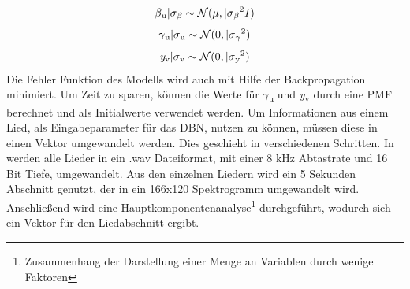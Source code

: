 \documentclass[twosided,a4,10pt]{article}
\begin{document}
\begin{multicols}{2}
\begin{equation*}
		\end{equation*}
		\begin{equation*}
		\centering
		\beta\textsubscript{u}|\sigma\textsubscript{$\beta$}\sim\mathcal{N}(\mu,|\sigma\textsubscript{$\beta$}\textsuperscript{2}I)
		\end{equation*}
		\begin{equation*}
		\centering
		\gamma\textsubscript{u}|\sigma\textsubscript{u}\sim\mathcal{N}(0,|\sigma\textsubscript{$\gamma$}\textsuperscript{2})
		\end{equation*}
		\begin{equation*}
		\centering
		\textit{y}\textsubscript{v}|\sigma\textsubscript{v}\sim\mathcal{N}(0,|\sigma\textsubscript{y}\textsuperscript{2})
		\end{equation*}\newline
		Die Fehler Funktion des Modells wird auch mit Hilfe der Backpropagation minimiert. Um Zeit zu sparen, können die Werte für $\gamma$\textsubscript{u} und \textit{y}\textsubscript{v} durch eine PMF berechnet und als Initialwerte verwendet werden. \cite{wang}\newline
		Um Informationen aus einem Lied, als Eingabeparameter für das DBN, nutzen zu können, müssen diese in einen Vektor umgewandelt werden. Dies geschieht in verschiedenen Schritten. In \cite{wang} werden alle Lieder in ein .wav Dateiformat, mit einer 8 kHz Abtastrate und 16 Bit Tiefe, umgewandelt. Aus den einzelnen Liedern wird ein 5 Sekunden Abschnitt genutzt, der in ein 166x120 Spektrogramm umgewandelt wird. Anschließend wird eine Hauptkomponentenanalyse\footnote[20]{Zusammenhang der Darstellung einer Menge an Variablen durch wenige Faktoren} durchgeführt, wodurch sich ein Vektor für den Liedabschnitt ergibt.

\end{multicols}
\end{document}
